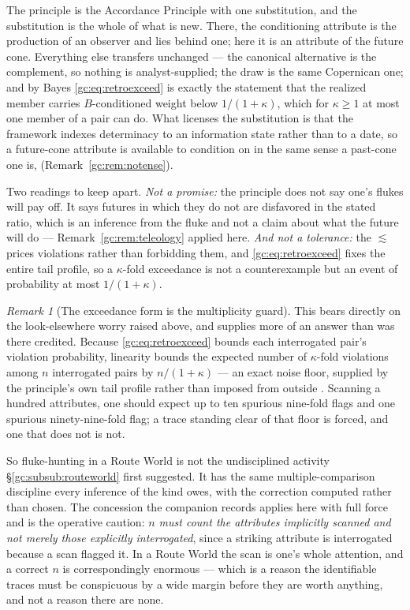 \documentclass[11pt]{article}
\numberwithin{equation}{section}
\theoremstyle{plain}
\theoremstyle{definition}
\theoremstyle{remark}
\newtheorem{remark}[theorem]{Remark}
\begin{document}
The principle is the Accordance Principle with one substitution, and the
substitution is the whole of what is new. There, the conditioning
attribute is the production of an observer and lies behind one; here it
is an attribute of the future cone. Everything else transfers unchanged
--- the canonical alternative is the complement, so nothing is
analyst-supplied; the draw is the same Copernican one; and by Bayes
\eqref{gc:eq:retroexceed} is exactly the statement that the realized
member carries $B$-conditioned weight below $1/(1+\kappa)$, which for
$\kappa\ge1$ at most one member of a pair can do. What licenses the
substitution is that the framework indexes determinacy to an information
state rather than to a date, so a future-cone attribute is available to
condition on in the same sense a past-cone one is,
(Remark~\ref{gc:rem:notense}).

Two readings to keep apart. \emph{Not a promise:} the principle does not
say one's flukes will pay off. It says futures in which they do not are
disfavored in the stated ratio, which is an inference from the fluke and
not a claim about what the future will do --- Remark~\ref{gc:rem:teleology}
applied here. \emph{And not a tolerance:} the $\lesssim$ prices
violations rather than forbidding them, and
\eqref{gc:eq:retroexceed} fixes the entire tail profile, so a
$\kappa$-fold exceedance is not a counterexample but an event of
probability at most $1/(1+\kappa)$.

\begin{remark}[The exceedance form is the multiplicity guard]
\label{gc:rem:noisefloor}
This bears directly on the look-elsewhere worry raised above, and
supplies more of an answer than was there credited. Because
\eqref{gc:eq:retroexceed} bounds each interrogated pair's violation
probability, linearity bounds the expected number of $\kappa$-fold
violations among $n$ interrogated pairs by $n/(1+\kappa)$ --- an exact
noise floor, supplied by the principle's own tail profile rather than
imposed from outside \cite{NexicFoundation}. Scanning a hundred
attributes, one should expect up to ten spurious nine-fold flags and one
spurious ninety-nine-fold flag; a trace standing clear of that floor is
forced, and one that does not is not.

So fluke-hunting in a Route World is not the undisciplined activity
\S\ref{gc:subsub:routeworld} first suggested. It has the same
multiple-comparison discipline every inference of the kind owes, with
the correction computed rather than chosen. The concession the companion
records applies here with full force and is the operative caution:
\emph{$n$ must count the attributes implicitly scanned and not merely
those explicitly interrogated}, since a striking attribute is
interrogated because a scan flagged it. In a Route World the scan is
one's whole attention, and a correct $n$ is correspondingly enormous ---
which is a reason the identifiable traces must be conspicuous by a wide
margin before they are worth anything, and not a reason there are none.
\end{remark}
\end{document}
